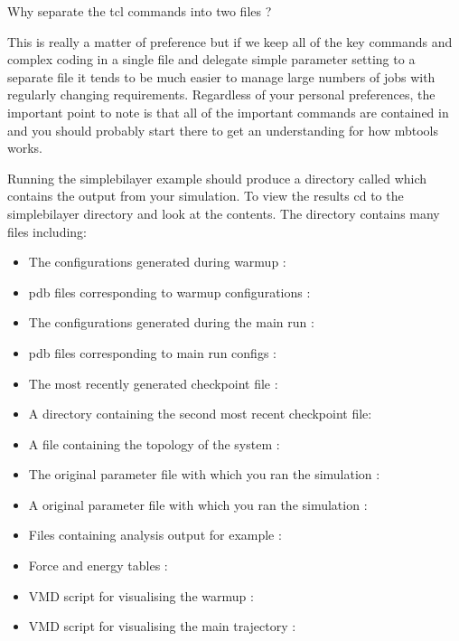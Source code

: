 Why separate the tcl commands into two files ?

This is really a matter of preference but if we keep all of the key
commands and complex coding in a single file  and
delegate simple parameter setting to a separate file it tends to be
much easier to manage large numbers of jobs with regularly changing
requirements. Regardless of your personal preferences, the important
point to note is that all of the important commands are contained in
 and you should probably start there to get an
understanding for how mbtools works.

Running the simplebilayer example should produce a directory called
 which contains the output from your
simulation. To view the results cd to the simplebilayer directory and
look at the contents. The directory contains many files including:

\begin{itemize}
\item The configurations generated during warmup :
\item pdb files corresponding to warmup configurations :
\item The configurations generated during the main run :
\item pdb files corresponding to main run configs :
\item The most recently generated checkpoint file :
\item A directory containing the second most recent checkpoint file:
\item A file containing the topology of the system :
\item The original parameter file with which you ran the simulation :
\item A original parameter file with which you ran the simulation :
\item Files containing analysis output for example :
\item Force and energy tables : 
\item VMD script for visualising the warmup :
\item VMD script for visualising the main trajectory :
\end{itemize}

